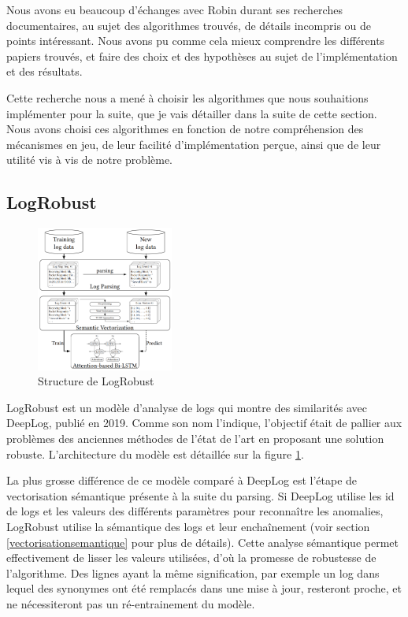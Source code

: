 \documentclass[openany, 11pt]{memoir}
\begin{document}
Nous avons eu beaucoup d'échanges avec Robin durant ses recherches documentaires, au sujet des algorithmes trouvés, de détails incompris ou de points intéressant. Nous avons pu comme cela mieux comprendre les différents papiers trouvés, et faire des choix et des hypothèses au sujet de l'implémentation et des résultats.

\bigskip
Cette recherche nous a mené à choisir les algorithmes que nous souhaitions implémenter pour la suite, que je vais détailler dans la suite de cette section. Nous avons choisi ces algorithmes en fonction de notre compréhension des mécanismes en jeu, de leur facilité d'implémentation perçue, ainsi que de leur utilité vis à vis de notre problème.

\subsection{LogRobust}

\begin{figure}[ht]
	\centering
	\includegraphics[width=0.4\textwidth]{images/logrobust.png}
	\caption{Structure de LogRobust}
	\label{logrobust}
\end{figure}

LogRobust \cite{logrobust} est un modèle d'analyse de \glspl{log} qui montre des similarités avec DeepLog, publié en 2019. Comme son nom l'indique, l'objectif était de pallier aux problèmes des anciennes méthodes de l'état de l'art en proposant une solution robuste. L'architecture du modèle est détaillée sur la figure \ref{logrobust}.

\bigskip
La plus grosse différence de ce modèle comparé à DeepLog est l'étape de vectorisation sémantique présente à la suite du parsing. Si DeepLog utilise les id de \glspl{log} et les valeurs des différents paramètres pour reconnaître les anomalies, LogRobust utilise la sémantique des \glspl{log} et leur enchaînement (voir section \ref{vectorisationsemantique} pour plus de détails). Cette analyse sémantique permet effectivement de lisser les valeurs utilisées, d'où la promesse de robustesse de l'algorithme. Des lignes ayant la même signification, par exemple un log dans lequel des synonymes ont été remplacés dans une mise à jour, resteront proche, et ne nécessiteront pas un ré-entrainement du modèle.
\end{document}
